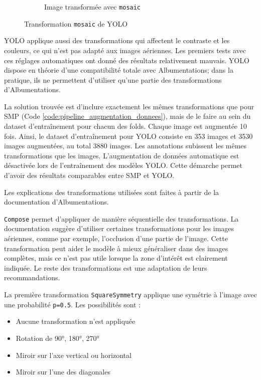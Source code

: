 \begin{figure}[H]
\begin{subfigure}[b]{0.49\textwidth}
        \caption{Image transformée avec \texttt{mosaic}}
        \label{fig:ch36_augmentations_00b_yolo_exemple1_mosaic}
    \end{subfigure}
    \caption{Transformation \texttt{mosaic} de YOLO}
    \label{fig:ch36_augmentation_donnees_yolo_mosaic}
\end{figure}

YOLO applique aussi des transformations qui affectent le contraste et les couleurs, ce qui n'est pas adapté aux images aériennes. Les premiers tests avec ces réglages automatiques ont donné des résultats relativement mauvais. YOLO dispose en théorie d'une compatibilité totale avec Albumentations; dans la pratique, ils ne permettent d'utiliser qu'une partie des transformations d'Albumentations.

La solution trouvée est d'inclure exactement les mêmes transformations que pour SMP (Code \ref{code:pipeline_augmentation_donnees}), mais de le faire au sein du dataset d'entraînement pour chacun des folds. Chaque image est augmentée 10 fois. Ainsi, le dataset d'entraînement pour YOLO consiste en 353 images et 3530 images augmentées, au total 3880 images. Les annotations subissent les mêmes transformations que les images. L'augmentation de données automatique est désactivée lors de l'entraînement des modèles YOLO. Cette démarche permet d'avoir des résultats comparables entre SMP et YOLO.

Les explications des transformations utilisées sont faites à partir de la documentation \cite{albumentations_documentation_nodate} d'Albumentations. 

\texttt{Compose} permet d'appliquer de manière séquentielle des transformations. La documentation suggère d'utiliser certaines transformations pour les images aériennes, comme par exemple, l'occlusion d'une partie de l'image. Cette transformation peut aider le modèle à mieux généraliser dans des images complètes, mais ce n'est pas utile lorsque la zone d'intérêt est clairement indiquée. Le reste des transformations est une adaptation de leurs recommandations.

La première transformation \texttt{SquareSymmetry} applique une symétrie à l'image avec une probabilité \texttt{p=0.5}. Les possibilités sont :
\begin{itemize}
    \item Aucune transformation n'est appliquée
    \item Rotation de 90°, 180°, 270°
    \item Miroir sur l'axe vertical ou horizontal
    \item Miroir sur l'une des diagonales
\end{itemize}

